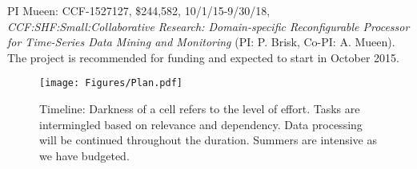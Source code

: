 PI Mueen: CCF-1527127, \$244,582, 10/1/15-9/30/18, \textit{CCF:SHF:Small:Collaborative Research: Domain-specific Reconfigurable Processor for Time-Series Data Mining and Monitoring} (PI: P. Brisk, Co-PI: A. Mueen). The project is recommended for funding and expected to start in October 2015.





\begin{figure*}[htp]
\vspace{-0.2cm}
\begin{center}
\texttt{[image: Figures/Plan.pdf]}
\vspace{-0.7cm} 
\caption{Timeline: Darkness of a cell refers to the level of effort. Tasks are intermingled based on relevance and dependency. Data processing will be continued throughout the duration. Summers are intensive as we have budgeted.}
\label{fig:plan}
\end{center}
\end{figure*} 

